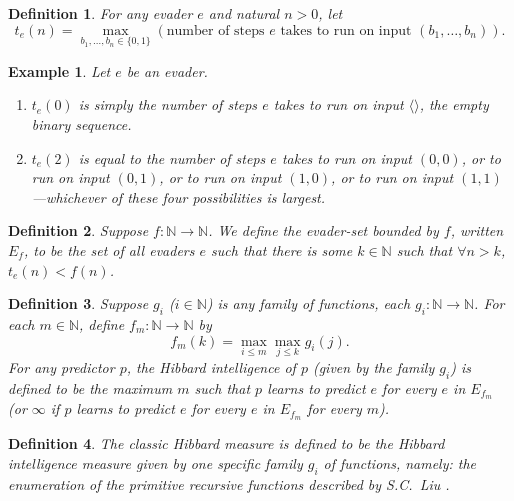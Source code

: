 \documentclass{article}
\newtheorem{definition}{Definition}
\newtheorem{example}[theorem]{Example}
\begin{document}
\begin{definition}
    For any evader $e$ and natural $n>0$,
    let
    \[
        t_e(n) = \max_{b_1,\ldots,b_n\in \{0,1\}}
        (\text{number of steps $e$ takes to run on input $(b_1,\ldots,b_n)$}).
    \]
\end{definition}

\begin{example}
Let $e$ be an evader.
\begin{enumerate}
    \item
    $t_e(0)$ is simply the number of steps $e$ takes to run on input $\langle\rangle$,
    the empty binary sequence.
    \item
    $t_e(2)$ is equal to the number of steps $e$ takes to run on input
    $(0,0)$, or to run on input $(0,1)$, or to run on input $(1,0)$, or to run on input
    $(1,1)$---whichever of these four possibilities is largest.
\end{enumerate}
\end{example}

\begin{definition}
\label{evadersetdefinition}
    Suppose $f:\mathbb N\to\mathbb N$. We define the \emph{evader-set bounded by $f$},
    written $E_f$, to be the set of all evaders $e$ such that
    there is some $k\in\mathbb N$ such that $\forall n>k$,
    $t_e(n)<f(n)$.
\end{definition}

\begin{definition}
\label{generalintelligencemeasuredefn}
    Suppose $g_i$ ($i\in \mathbb N$) is any family of functions,
    each $g_i:\mathbb N\to\mathbb N$.
    For each $m\in\mathbb N$, define $f_m:\mathbb N\to\mathbb N$ by
    \[f_m(k)=\max_{i\leq m}\max_{j\leq k}g_i(j).\]
    For any predictor $p$, the \emph{Hibbard intelligence of $p$ (given by the family $g_i$)}
    is defined to be the maximum $m$ such that
    $p$ learns to predict $e$ for every $e$ in $E_{f_m}$ (or $\infty$
    if $p$ learns to predict $e$ for every $e$ in $E_{f_m}$ for every $m$).
\end{definition}

\begin{definition}
\label{classichibbardmeasuredefn}
    The \emph{classic Hibbard measure} is defined to be the Hibbard intelligence
    measure given by one specific family $g_i$ of functions, namely:
    the enumeration of the primitive recursive functions described by S.C.\ Liu
    \cite{liu1960enumeration}.
\end{definition}
\end{document}
